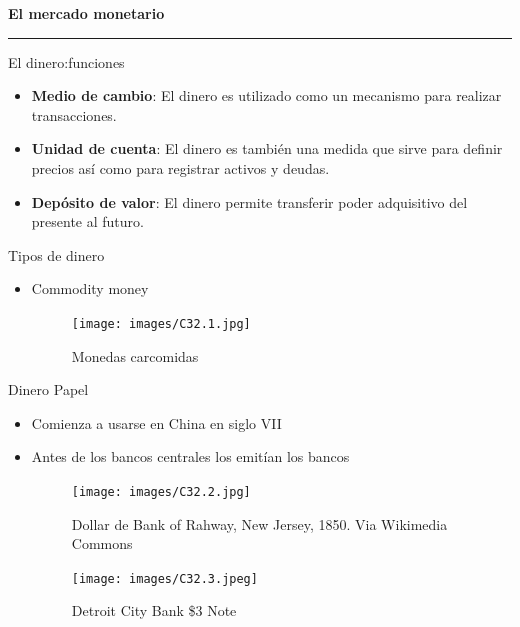\documentclass{beamer}
\begin{document}





\begin{frame}{}
\centering 	\huge \textbf{El mercado monetario} 
\vspace{2mm}
\hrule
\end{frame}

\begin{frame}{El dinero:funciones}
    \begin{itemize}
   
    \item \textbf{Medio de cambio}: El dinero es utilizado como un mecanismo para realizar transacciones. 
  
    \item \textbf{Unidad de cuenta}: El dinero es también una medida que sirve para definir precios así como para registrar activos y deudas.
    
    \item \textbf{Depósito de valor}: El dinero permite transferir poder adquisitivo del presente al futuro. 
    
\end{itemize}
\end{frame}


\begin{frame}{Tipos de dinero}
    \begin{itemize}
        \item Commodity money 
        \begin{figure} [H]   
  \centering
  \texttt{[image: images/C32.1.jpg]}
      \caption{Monedas carcomidas}
  \label{fig:C32.1}
\end{figure}
   
    \end{itemize}
\end{frame}

\begin{frame}{Dinero Papel}
    \begin{itemize}
        \item Comienza a usarse en China en siglo VII
        \item Antes de los bancos centrales los emitían los bancos 
        
        
\begin{figure} [H]   
  \centering
  \texttt{[image: images/C32.2.jpg]}
      \caption{Dollar de Bank of Rahway, New Jersey, 1850. Via Wikimedia Commons}
  \label{fig:C32.2}
\end{figure}

\begin{figure} [H]   
  \centering
  \texttt{[image: images/C32.3.jpeg]}
      \caption{Detroit City Bank \$3 Note}
  \label{fig:C32.3}
\end{figure}
\end{itemize}
\end{frame}
        
\end{document}
